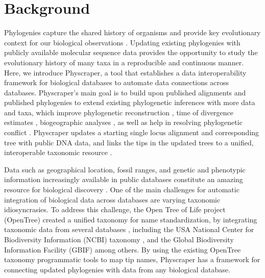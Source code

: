 \documentclass{bmcart}
\begin{document}

\section*{Background}
Phylogenies capture the shared history of organisms and provide key evolutionary
context for our biological observations \cite{dobzhansky1973nothing}.
Updating existing phylogenies with publicly available molecular sequence data provides
the opportunity to study
the evolutionary history of many taxa in a reproducible and continuous manner.
Here, we introduce Physcraper, a tool that establishes a data interoperability
framework for biological databases to automate data connections across databases.
Physcraper's main goal is to build upon published alignments and published phylogenies
to extend existing phylogenetic inferences with more data and taxa, which improve
phylogenetic reconstruction \cite{hillis1996inferring, natsidis2019phylogenomics},
time of divergence estimates \cite{schulte2013undersampling, soares2015influence},
biogeographic analyses \cite{kayaalp2017back},
as well as help in resolving phylogenetic conflict \cite{hedtke2006resolution, townsend2010optimal, natsidis2019phylogenomics}.
Physcraper updates a starting single locus alignment and corresponding tree
with public DNA data, and links the tips in the updated trees to a unified, interoperable
taxonomic resource \cite{rees2017automated}.

Data such as
geographical location, fossil ranges, and genetic and phenotypic information increasingly
available in public databases constitute an amazing
resource for biological discovery \cite{baxevanis2015importance}.
One of the main challenges for automatic
integration of biological data across databases are varying taxonomic idiosyncrasies.
To address this challenge, the Open Tree of Life project (OpenTree)
created a unified taxonomy for name standardization, by integrating taxonomic
data from several databases \cite{rees2017automated}, including the USA National
Center for Biodiversity Information (NCBI) taxonomy \cite{federhen_ncbi_2012, schoch_ncbi_2020},
and the Global Biodiversity Information Facility (GBIF) \cite{gbif_secretariat_gbif_2019} among others.
By using the existing OpenTree taxonomy programmatic tools to map tip names,
Physcraper has a framework for connecting updated phylogenies with data from any
biological database.
\end{document}
